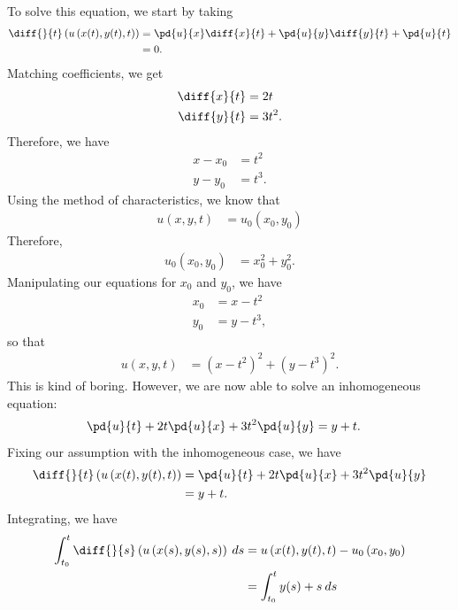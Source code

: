 \documentclass[10pt]{mypackage}
\begin{document}
\begin{example}
  To solve this equation, we start by taking
  \begin{align*}
    \diff{}{t}\left( u\left( x(t),y(t),t \right) \right) &= \pd{u}{x}\diff{x}{t} + \pd{u}{y}\diff{y}{t} + \pd{u}{t}\\
                                                         &= 0.
  \end{align*}
  Matching coefficients, we get
  \begin{align*}
    \diff{x}{t} &= 2t\\
    \diff{y}{t} &= 3t^2.
  \end{align*}
  Therefore, we have
  \begin{align*}
    x-x_0 &= t^2\\
    y-y_0 &= t^3.
  \end{align*}
  Using the method of characteristics, we know that
  \begin{align*}
    u\left( x,y,t \right) &= u_0\left( x_0,y_0 \right)
  \end{align*}
  Therefore,
  \begin{align*}
    u_0\left( x_0,y_0 \right) &= x_0^2 + y_0^2.
  \end{align*}
  Manipulating our equations for $x_0$ and $y_0$, we have
  \begin{align*}
    x_0 &= x-t^2\\
    y_0 &= y-t^3,
  \end{align*}
  so that
  \begin{align*}
    u\left( x,y,t \right) &= \left( x-t^2 \right)^2 + \left( y-t^3 \right)^2.
  \end{align*}
  This is kind of boring. However, we are now able to solve an inhomogeneous equation:
  \begin{align*}
    \pd{u}{t} + 2t\pd{u}{x} + 3t^2 \pd{u}{y} &= y + t.
  \end{align*}
  Fixing our assumption with the inhomogeneous case, we have
  \begin{align*}
    \diff{}{t}\left( u\left( x(t),y(t),t \right) \right) &= \pd{u}{t} + 2t \pd{u}{x} + 3t^2 \pd{u}{y}\\
                                                         &= y + t.
  \end{align*}
  Integrating, we have
  \begin{align*}
    \int_{t_0}^{t} \diff{}{s}\left( u\left( x(s),y(s),s \right) \right)\:ds &= u\left( x(t),y(t),t \right) - u_0\left( x_0,y_0 \right)\\
                                                                            &= \int_{t_0}^{t} y(s) + s \:ds\\

\end{align*}
\end{example}
\end{document}
